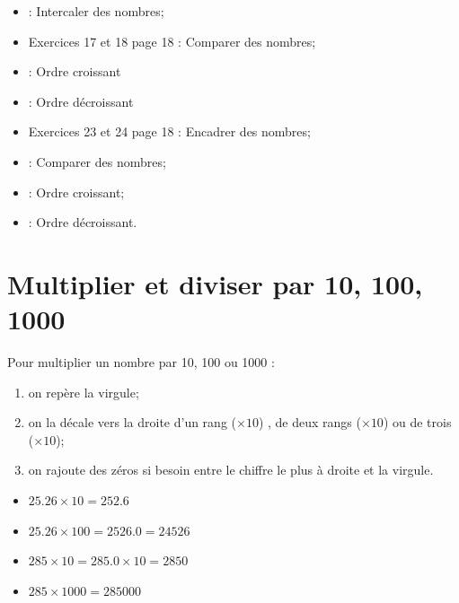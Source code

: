 \documentclass[12pt,a4paper]{article}
\begin{document}
\begin{myexos}
	\begin{itemize}
		\item {} : Intercaler des nombres;
		\item Exercices 17 et 18 page 18 : Comparer des nombres;
		\item {} : Ordre croissant
		\item {} : Ordre décroissant
		\item Exercices 23 et 24 page 18 : Encadrer des nombres;
		\item {} : Comparer des nombres;
		\item {} : Ordre croissant;
		\item {} : Ordre décroissant.
	\end{itemize}
\end{myexos}



\section{Multiplier et diviser par 10, 100, 1000}

\begin{mymeth}
	Pour multiplier un nombre par 10, 100 ou 1000 :
	\begin{enumerate}
		\item on repère la virgule;
		\item on la décale vers la droite d'un rang ($\times 10$) , de deux rangs ($\times 10$) ou de trois ($\times 10$);
		\item on rajoute des zéros si besoin entre le chiffre le plus à droite et la virgule.
	\end{enumerate}
\end{mymeth}

	\begin{myexs}
		\begin{multicols}{2}
			\begin{itemize}
				\item $\num{25.26} \times 10 = \num{252.6}$ 
				\item $\num{25.26} \times 100 = \num{2526.0} = \num{24526}$
				\item $\num{285} \times 10 = \num{285.0} \times \num{10}= \num{2850}$ 
				\item $\num{285} \times 1000 = \num{285000}$ 
			\end{itemize}	
		\end{multicols}
		
	\end{myexs}
\end{document}
